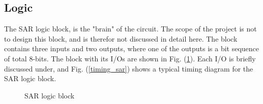 \documentclass[english, 12pt, a4paper]{ifimaster}
\begin{document}
\subsection{Logic}
The SAR logic block, is the "brain" of the circuit. The scope of the project is not to design this block, and is therefor not discussed in detail here. The block contains three inputs and 
two outputs, where one of the outputs is a bit sequence of total 8-bits. The block with its I/Os are shown in Fig. (\ref{sar:logic}). Each I/O is briefly discussed under, and Fig. (\ref{timing_sar})
shows a typical timing diagram for the SAR logic block.
\begin{figure}[!ht]
 \centering
 \caption{SAR logic block}
 \label{sar:logic}
\end{figure}
\end{document}
